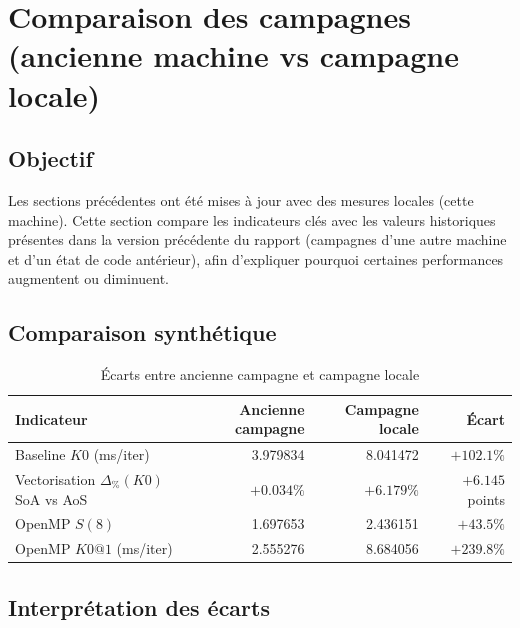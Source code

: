 \section{Comparaison des campagnes (ancienne machine vs campagne locale)}

\subsection{Objectif}

Les sections précédentes ont été mises à jour avec des mesures locales (cette machine).
Cette section compare les indicateurs clés avec les valeurs historiques présentes dans la version
précédente du rapport (campagnes d'une autre machine et d'un état de code antérieur), afin
d'expliquer pourquoi certaines performances augmentent ou diminuent.

\subsection{Comparaison synthétique}

\begin{table}[H]
\centering
\caption{Écarts entre ancienne campagne et campagne locale}
\label{tab:campagne-compare}
\begin{tabular}{@{}lrrr@{}}
\toprule
\textbf{Indicateur} & \textbf{Ancienne campagne} & \textbf{Campagne locale} & \textbf{Écart} \\
\midrule
Baseline \(K0\) (ms/iter) & 3.979834 & 8.041472 & \(+102.1\%\) \\
Vectorisation \(\Delta_{\%}(K0)\) SoA vs AoS & \(+0.034\%\) & \(+6.179\%\) & \(+6.145\) points \\
OpenMP \(S(8)\) & 1.697653 & 2.436151 & \(+43.5\%\) \\
OpenMP \(K0@1\) (ms/iter) & 2.555276 & 8.684056 & \(+239.8\%\) \\
\bottomrule
\end{tabular}
\end{table}

\subsection{Interprétation des écarts}

